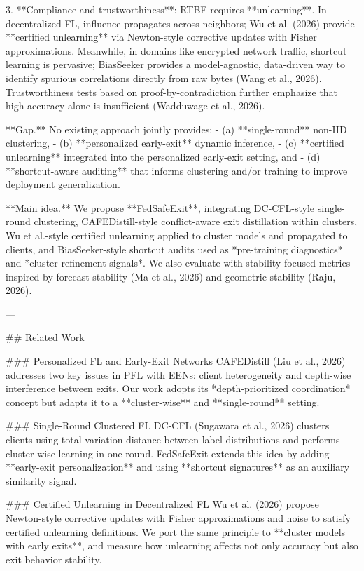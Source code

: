 3. **Compliance and trustworthiness**: RTBF requires **unlearning**. In decentralized FL, influence propagates across neighbors; Wu et al. (2026) provide **certified unlearning** via Newton-style corrective updates with Fisher approximations. Meanwhile, in domains like encrypted network traffic, shortcut learning is pervasive; BiasSeeker provides a model-agnostic, data-driven way to identify spurious correlations directly from raw bytes (Wang et al., 2026). Trustworthiness tests based on proof-by-contradiction further emphasize that high accuracy alone is insufficient (Wadduwage et al., 2026).

**Gap.** No existing approach jointly provides:  
- (a) **single-round** non-IID clustering,  
- (b) **personalized early-exit** dynamic inference,  
- (c) **certified unlearning** integrated into the personalized early-exit setting, and  
- (d) **shortcut-aware auditing** that informs clustering and/or training to improve deployment generalization.

**Main idea.** We propose **FedSafeExit**, integrating DC-CFL-style single-round clustering, CAFEDistill-style conflict-aware exit distillation within clusters, Wu et al.-style certified unlearning applied to cluster models and propagated to clients, and BiasSeeker-style shortcut audits used as *pre-training diagnostics* and *cluster refinement signals*. We also evaluate with stability-focused metrics inspired by forecast stability (Ma et al., 2026) and geometric stability (Raju, 2026).

---

## Related Work  

### Personalized FL and Early-Exit Networks  
CAFEDistill (Liu et al., 2026) addresses two key issues in PFL with EENs: client heterogeneity and depth-wise interference between exits. Our work adopts its *depth-prioritized coordination* concept but adapts it to a **cluster-wise** and **single-round** setting.

### Single-Round Clustered FL  
DC-CFL (Sugawara et al., 2026) clusters clients using total variation distance between label distributions and performs cluster-wise learning in one round. FedSafeExit extends this idea by adding **early-exit personalization** and using **shortcut signatures** as an auxiliary similarity signal.

### Certified Unlearning in Decentralized FL  
Wu et al. (2026) propose Newton-style corrective updates with Fisher approximations and noise to satisfy certified unlearning definitions. We port the same principle to **cluster models with early exits**, and measure how unlearning affects not only accuracy but also exit behavior stability.

